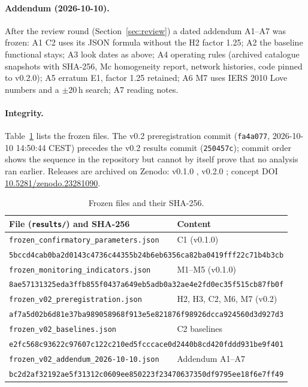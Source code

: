 \documentclass[11pt,a4paper]{article}
\begin{document}
\paragraph{Addendum (2026-10-10).}
After the review round (Section~\ref{sec:review}) a dated addendum A1--A7 was frozen: A1 C2 uses its JSON formula without the H2 factor 1.25; A2 the baseline functional stays; A3 look dates as above; A4 operating rules (archived catalogue snapshots with SHA-256, Mc homogeneity report, network histories, code pinned to v0.2.0); A5 erratum E1, factor 1.25 retained; A6 M7 uses IERS 2010 Love numbers \parencite{iers2010} and a $\pm20$\,h search; A7 reading notes.

\paragraph{Integrity.}
Table~\ref{tab:hashes} lists the frozen files. The v0.2 preregistration commit (\texttt{fa4a077}, 2026-10-10 14:50:44 CEST) precedes the v0.2 results commit (\texttt{250457c}); commit order shows the sequence in the repository but cannot by itself prove that no analysis ran earlier. Releases are archived on Zenodo: v0.1.0 \parencite{roemer2026v010}, v0.2.0 \parencite{roemer2026v020}; concept DOI \href{https://doi.org/10.5281/zenodo.23281090}{10.5281/zenodo.23281090}.

\begin{table}[t]
\centering\small
\caption{Frozen files and their SHA-256.}
\label{tab:hashes}
\begin{tabular}{ll}
\toprule
File (\texttt{results/}) and SHA-256 & Content\\
\midrule
\texttt{frozen\_confirmatory\_parameters.json} & C1 (v0.1.0)\\
\multicolumn{2}{l}{\quad\scriptsize\texttt{5bccd4cab0ba2d0143c4736c44355b24b6eb6356ca82ba0419fff22c71b4b3cb}}\\
\texttt{frozen\_monitoring\_indicators.json} & M1--M5 (v0.1.0)\\
\multicolumn{2}{l}{\quad\scriptsize\texttt{8ae57131325eda3ffb855f0437a649eb5adb0a32ae4e2fd0ec35f515cb87fb0f}}\\
\texttt{frozen\_v02\_preregistration.json} & H2, H3, C2, M6, M7 (v0.2)\\
\multicolumn{2}{l}{\quad\scriptsize\texttt{af7a5d02b6d81e37ba989058968f913e5e821876f98926dcca924560d3d927d3}}\\
\texttt{frozen\_v02\_baselines.json} & C2 baselines\\
\multicolumn{2}{l}{\quad\scriptsize\texttt{e2fc568c93622c97607c122c210ed5fcccace0d2440b8cd420fddd931be9f401}}\\
\texttt{frozen\_v02\_addendum\_2026-10-10.json} & Addendum A1--A7\\
\multicolumn{2}{l}{\quad\scriptsize\texttt{bc2d2af32192ae5f31312c0609ee850223f23470637350df9795ee18f6e7ff49}}\\
\bottomrule
\end{tabular}
\end{table}
\end{document}
